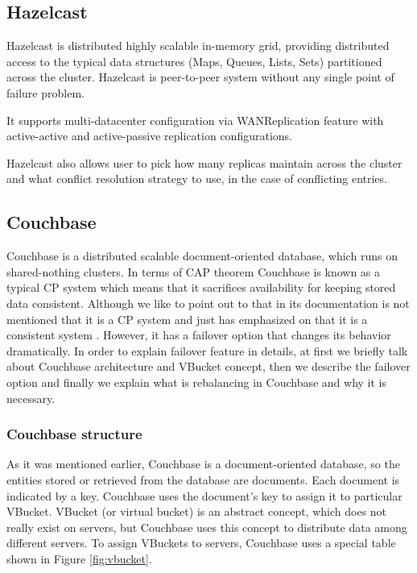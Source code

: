 \documentclass[a4paper]{article}
\begin{document}
\subsection{Hazelcast}
Hazelcast is distributed highly scalable in-memory grid, providing distributed access to the typical data structures (Maps, Queues, Lists, Sets) partitioned across the cluster. 
Hazelcast is peer-to-peer system without any single point of failure problem.

It supports multi-datacenter configuration via WANReplication feature with active-active and active-passive replication configurations.

Hazelcast also allows user to pick how many replicas maintain across the cluster and what conflict resolution strategy to use, in the case of conflicting entries.  

\subsection{Couchbase}

Couchbase is a distributed scalable document-oriented database, which runs on shared-nothing clusters.
In terms of CAP theorem Couchbase is known as a typical CP system \cite{Couchbasewiki} which means that it sacrifices availability for keeping stored data consistent.
Although we like to point out to that in its documentation is not mentioned that it is a CP system and just has emphasized on that it is a consistent system \cite{Couchbasedoc}.  
However, it has a failover option that changes its behavior dramatically. 
In order to explain failover feature in details, at first we briefly talk about Couchbase architecture and VBucket concept, then we describe the failover option and finally we explain what is rebalancing in Couchbase and why it is necessary.


\subsubsection{Couchbase structure}
As it was mentioned earlier, Couchbase is a document-oriented database, so the entities stored or retrieved from the database are documents. 
Each document is indicated by a key.
Couchbase uses the document's key to assign it to particular VBucket. 
VBucket (or virtual bucket) is an abstract concept, which does not really exist on servers, but Couchbase uses this concept to distribute data among different servers. 
To assign VBuckets to servers, Couchbase uses a special table shown in Figure \ref{fig:vbucket}.
\end{document}
